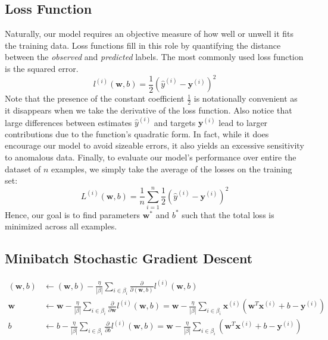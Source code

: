 \documentclass[a4paper,12pt]{article}
\theoremstyle{definition}
\begin{document}
    \subsection*{Loss Function}
    Naturally, our model requires an objective measure of how well or unwell it fits the training data.
    Loss functions fill in this role by quantifying the distance between the \textit{observed} and \textit{predicted}
    labels. The most commonly used loss function is the squared error.
    \begin{equation}
        l^{(i)}(\mathbf{w},b) = \frac{1}{2}(\hat{y}^{(i)}-\mathbf{y}^{(i)})^2
    \end{equation}
    Note that the presence of the constant coefficient $\frac{1}{2}$ is notationally convenient as it disappears when we
    take the derivative of the loss function. Also notice that large differences between estimates $\hat{y}^{(i)}$ 
    and targets $\mathbf{y}^{(i)}$ lead to larger contributions due to the function's quadratic form. In fact, while
    it does encourage our model to avoid sizeable errors, it also yields an excessive sensitivity to anomalous data.
    Finally, to evaluate our model's performance over entire the dataset of $n$ examples, we simply take the average of 
    the losses on the training set:
    \begin{equation}
        L^{(i)}(\mathbf{w},b) = \frac{1}{n}\sum_{i=1}^{n}\frac{1}{2}(\hat{y}^{(i)}-\mathbf{y}^{(i)})^2
    \end{equation}
    Hence, our goal is to find parameters $\mathbf{w}^*$ and $b^*$ such that 
    the total loss is minimized across all examples.

    \subsection*{Minibatch Stochastic Gradient Descent}
    \begin{equation*}
        \begin{aligned}
        (\mathbf{w},b) &\leftarrow (\mathbf{w},b) - \frac{\eta}{|\beta|}\sum_{i\in\beta_i}\frac{\partial}{\partial(\mathbf{w},b)}l^{(i)}(\mathbf{w},b) \\
        \mathbf{w}     &\leftarrow \mathbf{w} - \frac{\eta}{|\beta|}\sum_{i\in\beta_i}\frac{\partial}{\partial\mathbf{w}}l^{(i)}(\mathbf{w},b) = \mathbf{w}- \frac{\eta}{|\beta|}\sum_{i\in\beta_i}\mathbf{x}^{(i)}(\mathbf{w}^T\mathbf{x}^{(i)} + b - \mathbf{y}^{(i)}) \\
        b           &\leftarrow b - \frac{\eta}{|\beta|}\sum_{i\in\beta_i}\frac{\partial}{\partial b}l^{(i)}(\mathbf{w},b) = \mathbf{w}- \frac{\eta}{|\beta|}\sum_{i\in\beta_i}(\mathbf{w}^T\mathbf{x}^{(i)} + b - \mathbf{y}^{(i)})
        \end{aligned}
    \end{equation*}
\end{document}
